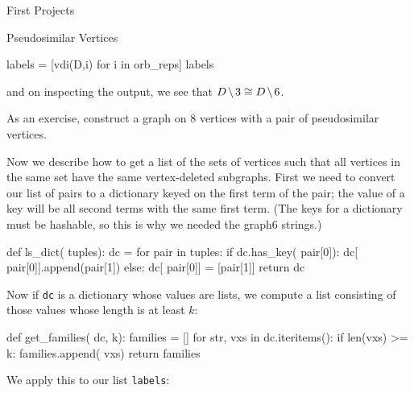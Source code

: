 \begin{chap}{First Projects}
\begin{sect}{Pseudosimilar Vertices}
\begin{sagecode}
\begin{sageinput}
labels = [vdi(D,i) for i in orb_reps]
labels
\end{sageinput}
\begin{sageoutput}
\end{sageoutput}
\end{sagecode}
%
\begin{para}
and on inspecting the output, we see that $D\mathbin{\mkern-1.5mu\setminus\mkern-1.5mu} 3\cong D\mathbin{\mkern-1.5mu\setminus\mkern-1.5mu} 6$.
\end{para}
%
\begin{para}
As an exercise, construct a graph on 8 vertices with a pair of pseudosimilar
vertices.
\end{para}
%
\begin{para}
Now we describe how to get a list of the sets of vertices such that all
vertices in the same set have the same vertex-deleted subgraphs.
First we need to convert our list of pairs to a dictionary keyed on the 
first term of the pair; the value of a key will be all second terms 
with the same first term. (The keys for a dictionary must be hashable, so this
is why we needed the graph6 strings.)
\end{para}
%
\begin{sagecode}
\begin{sageinput}
def ls_dict( tuples):
    dc = {} 
    for pair in tuples:
        if dc.has_key( pair[0]):
            dc[ pair[0]].append(pair[1])
        else:
            dc[ pair[0]] = [pair[1]]
    return dc
\end{sageinput}
\end{sagecode}
%
\begin{para}
Now if \verb|dc| is a dictionary whose values are lists, we compute a list consisting
of those values whose length is at least $k$:
\end{para}
%
\begin{sagecode}
\begin{sageinput}
def get_families( dc, k):
    families = []
    for str, vxs in dc.iteritems():
        if len(vxs) >= k:
            families.append( vxs)
    return families
\end{sageinput}
\end{sagecode}
%
\begin{para}
We apply this to our list \texttt{labels}:
\end{para}
%
\begin{sagecode}
\begin{sageinput}

\end{sageinput}
\end{sagecode}
\end{sect}
\end{chap}
